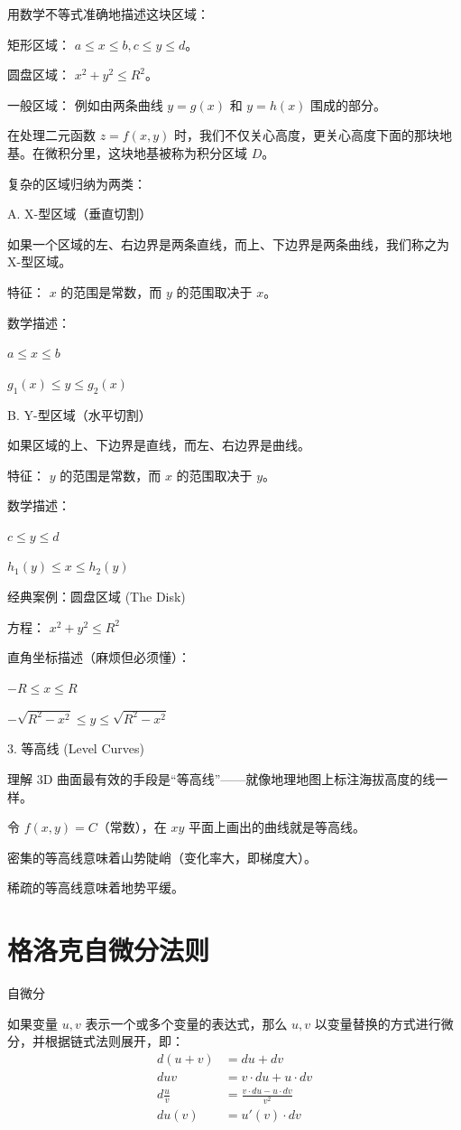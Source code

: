 用数学不等式准确地描述这块区域：

矩形区域： $a \le x \le b, c \le y \le d$。

圆盘区域： $x^2 + y^2 \le R^2$。

一般区域： 例如由两条曲线 $y=g(x)$ 和 $y=h(x)$ 围成的部分。


在处理二元函数 $z = f(x, y)$ 时，我们不仅关心高度，更关心高度下面的那块地基。在微积分里，这块地基被称为积分区域 $D$。

复杂的区域归纳为两类：

A. X-型区域（垂直切割）

如果一个区域的左、右边界是两条直线，而上、下边界是两条曲线，我们称之为 X-型区域。

特征： $x$ 的范围是常数，而 $y$ 的范围取决于 $x$。

数学描述：

$a \leq x \leq b$

$g_1(x) \leq y \leq g_2(x)$

B. Y-型区域（水平切割）

如果区域的上、下边界是直线，而左、右边界是曲线。

特征： $y$ 的范围是常数，而 $x$ 的范围取决于 $y$。

数学描述：

$c \leq y \leq d$

$h_1(y) \leq x \leq h_2(y)$

经典案例：圆盘区域 (The Disk)

方程： $x^2 + y^2 \leq R^2$

直角坐标描述（麻烦但必须懂）：

$-R \leq x \leq R$

$-\sqrt{R^2 - x^2} \leq y \leq \sqrt{R^2 - x^2}$




3. 等高线 (Level Curves)

理解 3D 曲面最有效的手段是“等高线”——就像地理地图上标注海拔高度的线一样。

令 $f(x, y) = C$（常数），在 $xy$ 平面上画出的曲线就是等高线。

密集的等高线意味着山势陡峭（变化率大，即梯度大）。

稀疏的等高线意味着地势平缓。


\section{格洛克自微分法则}

\begin{definition} 自微分

    如果变量 $u, v$ 表示一个或多个变量的表达式，那么 $u, v$ 以变量替换的方式进行微分，并根据链式法则展开，即：
    \begin{align}
        d(u + v) &= du + dv \\
        duv &= v\cdot du + u\cdot dv \\
        d\frac{u}{v} &= \frac{v\cdot du - u\cdot dv}{v^2} \\
        du(v) &= u'(v)\cdot dv
    \end{align}
\end{definition}

